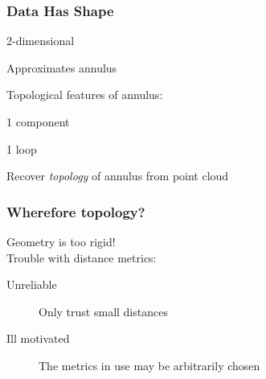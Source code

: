 \begin{frame}
\frametitle{Data Has Shape}
\begin{minipage}{0.45\columnwidth}%
\end{minipage}%
\begin{minipage}{0.55\columnwidth}%
\begin{description} 
\setlength{\itemindent}{-2.5em}
\item<2->   2-dimensional 
\item<3->   Approximates annulus
\end{description}
 {Topological features of annulus:}
\setlength{\itemindent}{-3em}
\begin{description}
\item<6-> 1 component
\item<7-> 1 loop 
\end{description}

\end{minipage}
\begin{description}
\item<8->[\textbf{Goal:}] Recover \emph{topology} of annulus from point cloud
\end{description}
\end{frame}

\begin{frame}
  \frametitle{Wherefore topology? }
  \begin{minipage}{.45\textwidth}
  \end{minipage}
  \begin{minipage}{.65\textwidth}
    Geometry is too rigid! \\
    \noindent Trouble with distance metrics:
    \begin{description}
    \item[Unreliable] Only trust small distances
    \item[Ill motivated] The metrics in use may be arbitrarily chosen
    \end{description}
    \end{minipage}
\end{frame}

